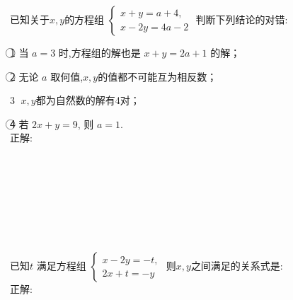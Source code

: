 \item {
    已知关于$x, y$的方程组
    $\begin{cases}
        x + y = a+4, \\ 
        x - 2y = 4a-2  
    \end{cases}$
    判断下列结论的对错:

    \textcircled{1} 当 $a=3$ 时,方程组的解也是 $x+y=2a+1$ 的解；

    \textcircled{2} 无论 $a$ 取何值,$x,y$的值都不可能互为相反数；

    \textcircled{3} $x,y$都为自然数的解有4对；

    \textcircled{4} 若 $2x+y=9$, 则 $a=1$.
    \ifshowSolution
        \fangsong{}
        \\
        正解:
    \else
        \\ \\ \\ \\ \\ \\ \\ \\
    \fi
}

\item {
    已知$t$ 满足方程组
    $\begin{cases}
        x - 2y = -t, \\ 
        2x + t = -y  
    \end{cases}$
    则$x,y$之间满足的关系式是:
    \ifshowSolution
        \fangsong{}
        \\
        正解:
    \else
        \\ \\ \\ \\ \\
    \fi
}


